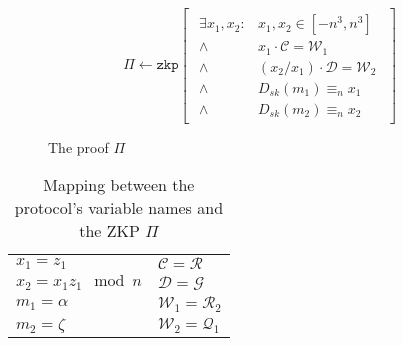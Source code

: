 \begin{figure}[h]
    \begin{table}[H]
      \centering
      \begin{footnotesize}
        \[
        \Pi \leftarrow \texttt{zkp} \begin{bmatrix}\begin{array}{lr}
                                      \exists x_1, x_2 : & x_1, x_2 \in [-n^3, n^3] \\
                                      \land & x_1 \cdot \mathcal{C} = \mathcal{W}_1 \\
                                      \land & (x_2/x_1) \cdot \mathcal{D} = \mathcal{W}_2 \\
                                      \land & D_{sk}(m_1) \equiv_n x_1 \\
                                      \land & D_{sk}(m_2) \equiv_n x_2
                                     \end{array}\end{bmatrix}
        \]
      \end{footnotesize}
    \end{table}

  \caption{The proof $\Pi$}
  \label{fig:theProofPi}
\end{figure}

\begin{table}[h]
  \begin{tabular}{p{4cm} l}
    $x_1 = z_1$ & $\mathcal{C} = \mathcal{R}$ \\
    $x_2 = x_1z_1 \mod n$ & $\mathcal{D} = \mathcal{G}$ \\
    $m_1 = \alpha$ & $\mathcal{W}_1 = \mathcal{R}_2$ \\
    $m_2 = \zeta$ & $\mathcal{W}_2 = \mathcal{Q}_1$
  \end{tabular}
  \caption{Mapping between the protocol's variable names and the ZKP $\Pi$}
  \label{fig:mappingOfVarNamesPi}
\end{table}

